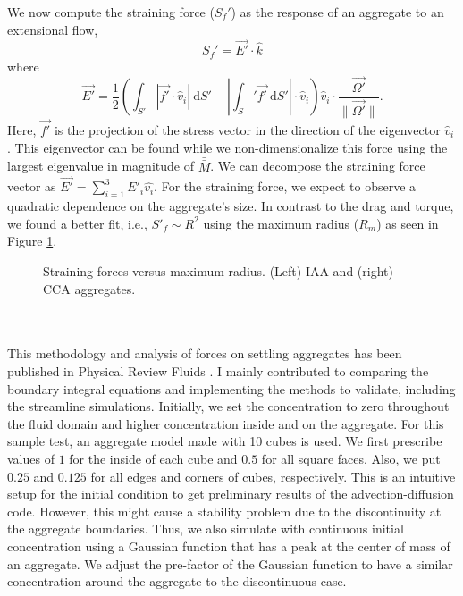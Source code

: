 \par
We now compute the straining force ($S_f'$) as the response of an aggregate to an extensional flow,
\begin{equation}
S_f' = \vec{E'} \cdot \hat{k}
\end{equation}
where
\begin{equation}
\vec{E'} = \frac{1}{2} \left( 
\int_{S'} \left|\vec{f'} \cdot \hat{v}_i \right| \ \text{d}S'-
\left| \int_S' \vec{f'} \ \text{d} S' \right|\cdot \hat{v}_i
 \right)  \hat{v}_i
 \cdot \frac{\vec{\Omega'}}{\|\vec{\Omega'}\|}.
\end{equation}
Here,  $\vec{f'}$ is the projection of the stress vector in the direction of the eigenvector $\hat{v}_i$.
This eigenvector can be found while we non-dimensionalize this force using the largest eigenvalue in magnitude of $\bar{ \bar{M} }$.
We can decompose the straining force vector as $\vec{E'} = \sum_{i=1}^3 E'_i \hat{v_i}$. 
For the straining force, we expect to observe a quadratic dependence on the aggregate's size. In contrast to the drag and torque, we found a better fit, i.e., $S'_f \sim R^2$ using the maximum radius ($R_m$) as seen in Figure \ref{fig_straining}. 
\begin{figure}[h]
\begin{center}
\end{center}
\caption{Straining forces versus maximum radius. (Left) IAA and (right) CCA aggregates.}
\label{fig_straining}
\end{figure}
\\
\\
This methodology and analysis of forces on settling aggregates has been published in Physical Review Fluids \cite{yoo_hydrodynamic_2020}.
I mainly contributed to comparing the boundary integral equations and implementing the methods to validate, including the streamline simulations. 
Initially, we set the concentration to zero throughout the fluid domain and higher concentration inside and on the aggregate. For this sample test, an aggregate model made with 10 cubes is used. We first prescribe values of $1$ for the inside of each cube and $0.5$ for all square faces. Also, we put $0.25$ and $0.125$ for all edges and corners of cubes, respectively. This is an intuitive setup for the initial condition to get preliminary results of the advection-diffusion code. However, this might cause a stability problem due to the discontinuity at the aggregate boundaries. Thus, we also simulate with continuous initial concentration using a Gaussian function that has a peak at the center of mass of an aggregate. We adjust the pre-factor of the Gaussian function to have a similar concentration around the aggregate to the discontinuous case. 

